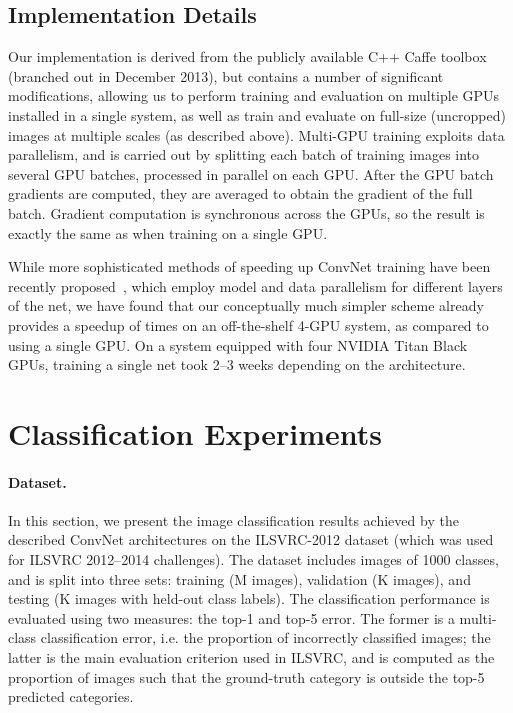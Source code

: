 \documentclass{article} \usepackage{iclr2015,times}
\makeatletter
\newcommand*{\ie}{i.e.\@\xspace}
\makeatother
\begin{document}
\subsection{Implementation Details}
Our implementation is derived from the publicly available C++ Caffe toolbox~\citep{Jia13} (branched out in December 2013), but contains a number of significant modifications, 
allowing us to perform training and evaluation on multiple GPUs installed in a single system, as well as train and evaluate on full-size (uncropped) images at multiple scales (as described above).
Multi-GPU training exploits data parallelism, and is carried out by splitting each batch of training images into several GPU batches, processed in parallel on each GPU. 
After the GPU batch gradients are computed, they are averaged to obtain the gradient of the full batch.
Gradient computation is synchronous across the GPUs, so the result is exactly the same as when training on a single GPU.

While more sophisticated methods of speeding up ConvNet training have been recently proposed~\citep{Krizhevsky14}, which employ model and data parallelism for different layers
of the net, we have found that our conceptually much simpler scheme already provides a speedup of  times on an off-the-shelf \mbox{4-GPU} system, as compared to using a single GPU.
On a system equipped with four NVIDIA Titan Black GPUs, training a single net took 2--3 weeks depending on the architecture.

\section{Classification Experiments}
\label{sec:exp}

\paragraph{Dataset.}
In this section, we present the image classification results achieved by the described ConvNet architectures on the ILSVRC-2012 dataset (which was used for ILSVRC 2012--2014 challenges).
The dataset includes images of 1000 classes, and is split into three sets: training (M images), validation (K images), and testing (K images with held-out class labels).
The classification performance is evaluated using two measures: the top-1 and top-5 error. The former is a multi-class classification error, \ie the proportion of incorrectly
classified images; the latter is the main evaluation criterion used in ILSVRC, and is computed as the proportion of images such that the ground-truth category is outside the top-5 predicted categories.
\end{document}
